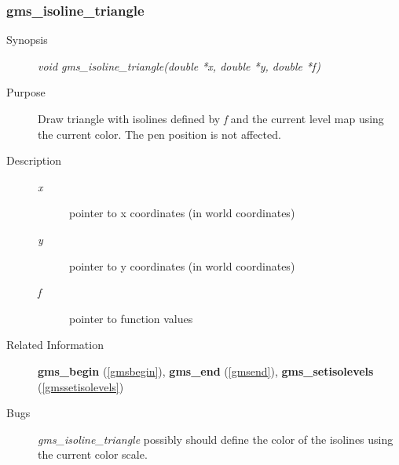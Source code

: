 \subsubsection{gms\_isoline\_triangle\label{gmsisolinetriangle}}
\begin{description}
\item[Synopsis]\mbox{}


{\em void    gms\_isoline\_triangle(double *x, double *y, double *f)\/}
\item[Purpose]\mbox{}


Draw  triangle with isolines defined by {\em f\/} and the 
current level map using the current color.
The pen position is not affected.
\item[Description]\mbox{}


\begin{description}
\item[{\em x\/}]\mbox{}

 pointer to x coordinates (in world coordinates)
\item[{\em y\/}]\mbox{}

 pointer to y coordinates (in world coordinates)
\item[{\em f\/}]\mbox{}

 pointer to function values
\end{description}

\item[Related Information]\mbox{}


{\bf gms\_begin} (\ref{gmsbegin}), 
{\bf gms\_end} (\ref{gmsend}),
{\bf gms\_setisolevels} (\ref{gmssetisolevels})
\item[Bugs]\mbox{}


{\em gms\_isoline\_triangle\/} possibly should define the color 
of the isolines using the current color scale. 
\end{description}



\newpage



